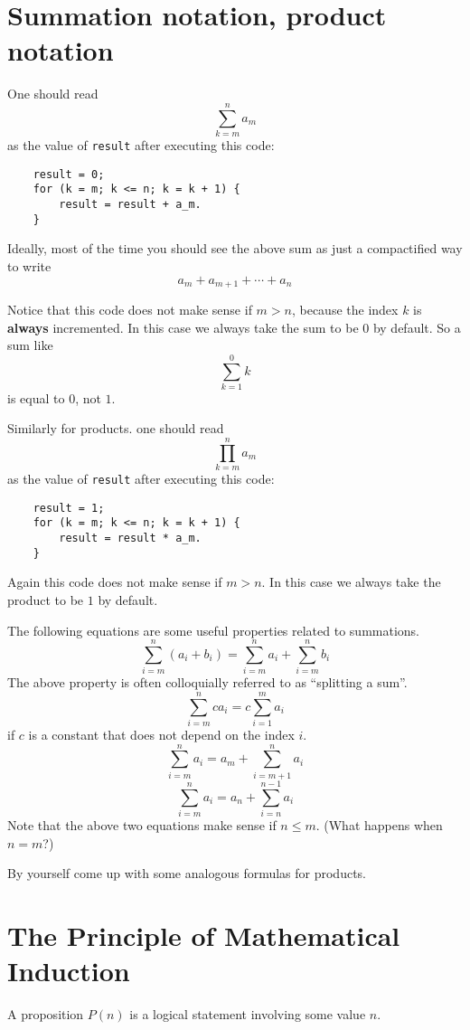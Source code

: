 \section{Summation notation, product notation}

One should read 
\[\sum_{k = m}^na_m\] as the value of \verb|result| after executing this code:
\begin{verbatim}
    result = 0;
    for (k = m; k <= n; k = k + 1) {
        result = result + a_m.
    }
\end{verbatim}

Ideally, most of the time you should see the above sum as just a compactified way to write 
\[a_m + a_{m + 1} + \cdots + a_n\]

Notice that this code does not make sense if $m > n$, because the index $k$ is \textbf{always} incremented. In this case we always take the sum to be $0$ by default. So a sum like
\[\sum_{k = 1}^0k\] is equal to $0$, not $1$.

Similarly for products. one should read \[\prod_{k = m}^na_m\] as the value of \verb|result| after executing this code:

\begin{verbatim}
    result = 1;
    for (k = m; k <= n; k = k + 1) {
        result = result * a_m.
    }
\end{verbatim}

Again this code does not make sense if $m > n$. In this case we always take the product to be $1$ by default.

The following equations are some useful properties related to summations.
\[\sum_{i = m}^n(a_i + b_i) = \sum_{i = m}^na_i + \sum_{i = m}^nb_i\]
The above property is often colloquially referred to as ``splitting a sum''.
\[\sum_{i = m}^nca_i = c\sum_{i = 1}^ma_i\] if $c$ is a constant that does not depend on the index $i$.
\[\sum_{i = m}^na_i = a_m + \sum_{i = m + 1}^na_i\]
\[\sum_{i = m}^na_i = a_n + \sum_{i = n}^{n-1}a_i\]
Note that the above two equations make sense if $n \leq m$. (What happens when $n = m$?)

By yourself come up with some analogous formulas for products.

\section{The Principle of Mathematical Induction}

\begin{definition}
    A proposition $P(n)$ is a logical statement involving some value $n$.
\end{definition}

